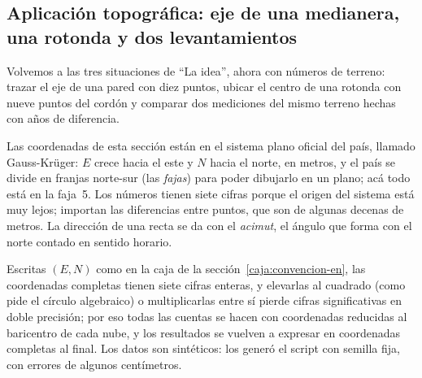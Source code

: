 \subsection{Aplicación topográfica: eje de una medianera, una rotonda y dos levantamientos}

Volvemos a las tres situaciones de \enquote{La idea}, ahora con números de terreno: trazar el eje de
una pared con diez puntos, ubicar el centro de una rotonda con nueve puntos del cordón y
comparar dos mediciones del mismo terreno hechas con años de diferencia.

\begin{idea}
Las coordenadas de esta sección están en el sistema plano oficial del país, llamado
Gauss-Krüger: \(E\) crece hacia el este y \(N\) hacia el norte, en metros, y el país se divide
en franjas norte-sur (las \emph{fajas}) para poder dibujarlo en un plano; acá todo está en la
faja~5. Los números tienen siete cifras porque el origen del sistema está muy lejos; importan
las diferencias entre puntos, que son de algunas decenas de metros. La dirección de una recta
se da con el \emph{acimut}, el ángulo que forma con el norte contado en sentido horario.
\end{idea}

Escritas \((E,N)\) como en la caja de la sección~\ref{caja:convencion-en}, las coordenadas
completas tienen siete cifras enteras, y elevarlas al cuadrado (como pide el círculo
algebraico) o multiplicarlas entre sí pierde cifras significativas en doble precisión; por eso
todas las cuentas se hacen con coordenadas reducidas al baricentro de cada nube, y los
resultados se vuelven a expresar en coordenadas completas al final. Los datos son sintéticos:
los generó el script con semilla fija, con errores de algunos centímetros.

